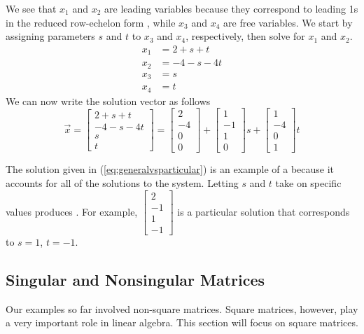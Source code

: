 \documentclass{ximera}
\begin{document}
\begin{example}
\begin{explanation}
        We see that $x_1$ and $x_2$ are leading variables because they correspond to leading 1s in the reduced row-echelon form , while $x_3$ and $x_4$ are free variables.  We start by assigning parameters $s$ and $t$ to $x_3$ and $x_4$, respectively, then solve for $x_1$ and $x_2$.
\begin{align*}x_1&=2+s+t\\
        x_2&=-4-s-4t\\
        x_3&=s\\
        x_4&=t
        \end{align*}
       We can now write the solution vector as follows
       \begin{equation}\label{eq:generalvsparticular}\vec{x}=\begin{bmatrix}2+s+t\\-4-s-4t\\s\\t\end{bmatrix}=\begin{bmatrix}2\\-4\\0\\0\end{bmatrix}+\begin{bmatrix}1\\-1\\1\\0\end{bmatrix}s+\begin{bmatrix}1\\-4\\0\\1\end{bmatrix}t\end{equation}
\end{explanation}
\end{example}

The solution given in (\ref{eq:generalvsparticular}) is an example of a  because it accounts for all of the solutions to the system.  Letting $s$ and $t$ take on specific values produces .  For example, $\begin{bmatrix}2\\-1\\1\\-1\end{bmatrix}$ is a particular solution that corresponds to $s=1$, $t=-1$.

\subsection*{Singular and Nonsingular Matrices}
Our examples so far involved non-square matrices.  Square matrices, however, play a very important role in linear algebra.  This section will focus on square matrices.
\end{document}
